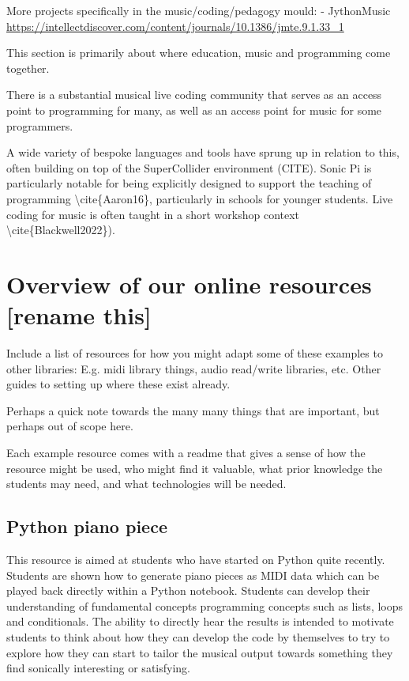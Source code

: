 More projects specifically in the music/coding/pedagogy mould:
 - JythonMusic \url{https://intellectdiscover.com/content/journals/10.1386/jmte.9.1.33_1}

 This section is primarily about where education, music and programming come together.


 There is a substantial musical live coding community that serves as an access point to programming for many, as well as an access point for music for some programmers.


A wide variety of bespoke languages and tools have sprung up in relation to this, often building on top of the SuperCollider environment (CITE). Sonic Pi is particularly notable for being explicitly designed to support the teaching of programming \textbackslash{}cite\{Aaron16\}, particularly in schools for younger students. Live coding for music is often taught in a short workshop context \textbackslash{}cite\{Blackwell2022\}).



\section{Overview of our online resources [rename this]} \label{sec:resources}


Include a list of resources for how you might adapt some of these examples to other libraries:
E.g. midi library things, audio read/write libraries, etc.
Other guides to setting up where these exist already.

Perhaps a quick note towards the many many things that are important, but perhaps out of scope here.

Each example resource comes with a readme that gives a sense of how the resource might be used, who might find it valuable, what prior knowledge the students may need, and what technologies will be needed.

\subsection{Python piano piece}
This resource is aimed at students who have started on Python quite recently. Students are shown how to generate piano pieces as MIDI data which can be played back directly within a Python notebook. Students can develop their understanding of fundamental concepts programming concepts such as lists, loops and conditionals. The ability to directly hear the results is intended to motivate students to think about how they can develop the code by themselves to try to explore how they can start to tailor the musical output towards something they find sonically interesting or satisfying.

